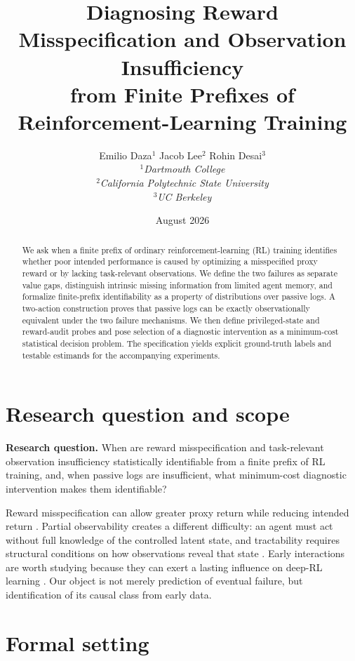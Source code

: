 \documentclass[9pt,twocolumn]{extarticle}
\title{Diagnosing Reward Misspecification and Observation Insufficiency\\
from Finite Prefixes of Reinforcement-Learning Training}
\author{%
Emilio Daza$^{1}$ \qquad Jacob Lee$^{2}$ \qquad Rohin Desai$^{3}$\\[0.45em]
\small $^{1}$\textit{Dartmouth College}\\
\small $^{2}$\textit{California Polytechnic State University}\\
\small $^{3}$\textit{UC Berkeley}}
\date{August 2026}
\begin{document}
\maketitle
\vspace{-1.2em}

\begin{abstract}
We ask when a finite prefix of ordinary reinforcement-learning (RL) training
identifies whether poor intended performance is caused by optimizing a
misspecified proxy reward or by lacking task-relevant observations. We define
the two failures as separate value gaps, distinguish intrinsic missing
information from limited agent memory, and formalize finite-prefix
identifiability as a property of distributions over passive logs. A two-action
construction proves that passive logs can be exactly observationally
equivalent under the two failure mechanisms. We then define privileged-state
and reward-audit probes and pose selection of a diagnostic intervention as a
minimum-cost statistical decision problem. The specification yields explicit
ground-truth labels and testable estimands for the accompanying experiments.
\end{abstract}

\section{Research question and scope}

\textbf{Research question.} When are reward misspecification and task-relevant
observation insufficiency statistically identifiable from a finite prefix of
RL training, and, when passive logs are insufficient, what minimum-cost
diagnostic intervention makes them identifiable?

Reward misspecification can allow greater proxy return while reducing intended
return \cite{pan2022effects}. Partial observability creates a different
difficulty: an agent must act without full knowledge of the controlled latent
state, and tractability requires structural conditions on how observations
reveal that state \cite{liu2022pomdp}. Early interactions are worth studying
because they can exert a lasting influence on deep-RL learning
\cite{nikishin2022primacy}. Our object is not merely prediction of eventual
failure, but identification of its causal class from early data.

\section{Formal setting}
\end{document}
